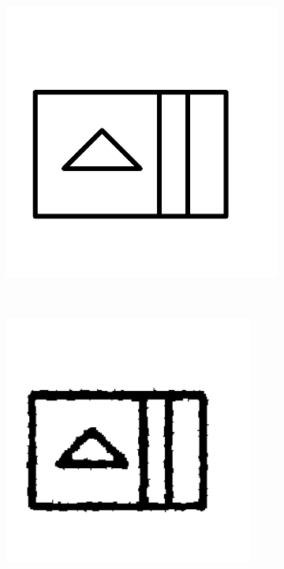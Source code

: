     \begin{figure}[h]
        \centering
                \begin{subfigure}[b]{0.2\textwidth}
                \centering
                \includegraphics[width=1.1\textwidth]{figures/Results/NoiseB/Model.png}
                \caption{}
        \end{subfigure}\\
                \begin{subfigure}[b]{0.25\textwidth}
                \centering
                \includegraphics[width=0.9\textwidth]{figures/Results/NoiseB/1.png}

\end{subfigure}
\end{figure}
